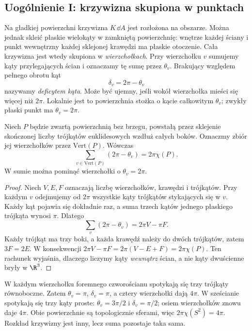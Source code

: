 \subsection*{Uogólnienie I: krzywizna skupiona w punktach}

Na gładkiej powierzchni krzywizna $K\,\dd A$ jest
rozłożona na obszarze. Można jednak skleić płaskie
wielokąty w zamkniętą powierzchnię: wnętrze każdej ściany
i punkt wewnętrzny każdej sklejonej krawędzi ma płaskie
otoczenie. Cała krzywizna jest wtedy skupiona w
\emph{wierzchołkach}. Przy wierzchołku $v$ sumujemy kąty
przylegających ścian i oznaczamy tę sumę przez $\theta_v$.
Brakujący względem pełnego obrotu kąt
\begin{equation}\label{eq:gb-deficyt-kata}
 \delta_v=2\pi-\theta_v
\end{equation}
nazywamy \emph{deficytem kąta}. Może być ujemny, jeśli
wokół wierzchołka mieści się więcej niż $2\pi$.
Lokalnie jest to powierzchnia stożka o kącie całkowitym
$\theta_v$; zwykły płaski punkt ma $\theta_v=2\pi$.

\begin{twierdzenie}
\label{thm:gb-wielosciany}
Niech $P$ będzie zwartą powierzchnią bez brzegu,
powstałą przez sklejenie skończonej liczby trójkątów
euklidesowych wzdłuż całych boków. Oznaczmy zbiór
jej wierzchołków przez $\mathrm{Vert}(P)$. Wówczas
\begin{equation}\label{eq:gb-wielosciany}
 \boxed{\displaystyle\sum_{v\in\mathrm{Vert}(P)}(2\pi-\theta_v)
                      =2\pi\chi(P).}
\end{equation}
W sumie można pominąć wierzchołki o $\theta_v=2\pi$.
\end{twierdzenie}
\begin{proof}
Niech $V,E,F$ oznaczają liczbę wierzchołków, krawędzi
i trójkątów. Przy każdym $v$ odejmujemy od $2\pi$
wszystkie kąty trójkątów stykających się w $v$.
Każdy kąt pojawia się dokładnie raz, a suma trzech kątów
jednego płaskiego trójkąta wynosi $\pi$. Dlatego
\[
 \sum_v(2\pi-\theta_v)=2\pi V-\pi F.
\]
Każdy trójkąt ma trzy boki, a każda krawędź należy do
dwóch trójkątów, zatem $3F=2E$. W konsekwencji
$2\pi V-\pi F=2\pi(V-E+F)=2\pi\chi(P)$.
Ten rachunek wyjaśnia, dlaczego liczymy kąty \emph{wewnątrz}
ścian, a nie kąty dwuścienne bryły w $\R^3$.
\end{proof}

\begin{przyklad}
W każdym wierzchołku foremnego czworościanu spotykają
się trzy trójkąty równoboczne. Zatem $\theta_v=\pi$,
$\delta_v=\pi$, a cztery wierzchołki dają $4\pi$.
W sześcianie spotykają się trzy kąty proste:
$\theta_v=3\pi/2$ i $\delta_v=\pi/2$; osiem
wierzchołków znowu daje $4\pi$. Obie powierzchnie są
topologicznie sferami, więc $2\pi\chi(S^2)=4\pi$.
Rozkład krzywizny jest inny, lecz suma pozostaje taka sama.
\end{przyklad}


